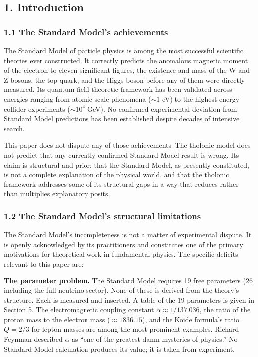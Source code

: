 \documentclass[
  11pt,
  letterpaper,
]{article}
\begin{document}
\subsection{1. Introduction}\label{introduction}

\subsubsection{1.1 The Standard Model's
achievements}\label{the-standard-models-achievements}

The Standard Model of particle physics is among the most successful
scientific theories ever constructed. It correctly predicts the
anomalous magnetic moment of the electron to eleven significant figures,
the existence and mass of the W and Z bosons, the top quark, and the
Higgs boson before any of them were directly measured. Its quantum field
theoretic framework has been validated across energies ranging from
atomic-scale phenomena (\(\sim 1\) eV) to the highest-energy collider
experiments (\(\sim 10^4\) GeV). No confirmed experimental deviation
from Standard Model predictions has been established despite decades of
intensive search.

This paper does not dispute any of those achievements. The tholonic
model does not predict that any currently confirmed Standard Model
result is wrong. Its claim is structural and prior: that the Standard
Model, as presently constituted, is not a complete explanation of the
physical world, and that the tholonic framework addresses some of its
structural gaps in a way that reduces rather than multiplies explanatory
posits.

\subsubsection{1.2 The Standard Model's structural
limitations}\label{the-standard-models-structural-limitations}

The Standard Model's incompleteness is not a matter of experimental
dispute. It is openly acknowledged by its practitioners and constitutes
one of the primary motivations for theoretical work in fundamental
physics. The specific deficits relevant to this paper are:

\textbf{The parameter problem.} The Standard Model requires 19 free
parameters (26 including the full neutrino sector). None of these is
derived from the theory's structure. Each is measured and inserted. A
table of the 19 parameters is given in Section 5. The electromagnetic
coupling constant \(\alpha \approx 1/137.036\), the ratio of the proton
mass to the electron mass (\(\approx 1836.15\)), and the Koide formula's
ratio \(Q = 2/3\) for lepton masses are among the most prominent
examples. Richard Feynman described \(\alpha\) as ``one of the greatest
damn mysteries of physics.'' No Standard Model calculation produces its
value; it is taken from experiment.
\end{document}
